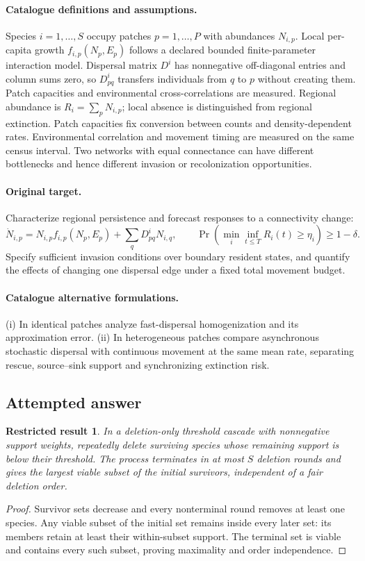 \documentclass[11pt]{article}
\newtheorem{attemptresult}{Restricted result}[section]
\begin{document}
\paragraph{Catalogue definitions and assumptions.}
Species $i=1,\ldots,S$ occupy patches $p=1,\ldots,P$ with abundances $N_{i,p}$. Local per-capita growth $f_{i,p}(N_p,E_p)$ follows a declared bounded finite-parameter interaction model. Dispersal matrix $D^i$ has nonnegative off-diagonal entries and column sums zero, so $D^i_{pq}$ transfers individuals from $q$ to $p$ without creating them. Patch capacities and environmental cross-correlations are measured. Regional abundance is $R_i=\sum_pN_{i,p}$; local absence is distinguished from regional extinction. Patch capacities fix conversion between counts and density-dependent rates. Environmental correlation and movement timing are measured on the same census interval. Two networks with equal connectance can have different bottlenecks and hence different invasion or recolonization opportunities.
\paragraph{Original target.}
Characterize regional persistence and forecast responses to a connectivity change:
\[
 \dot N_{i,p}=N_{i,p}f_{i,p}(N_p,E_p)+\sum_qD^i_{pq}N_{i,q},
 \qquad
 \Pr(\min_i\inf_{t\le T}R_i(t)\ge\eta_i)\ge1-\delta.
\]
Specify sufficient invasion conditions over boundary resident states, and quantify the effects of changing one dispersal edge under a fixed total movement budget.
\paragraph{Catalogue alternative formulations.}
(i) In identical patches analyze fast-dispersal homogenization and its approximation error. (ii) In heterogeneous patches compare asynchronous stochastic dispersal with continuous movement at the same mean rate, separating rescue, source--sink support and synchronizing extinction risk.
\subsection{Attempted answer}
\begin{attemptresult}
In a deletion-only threshold cascade with nonnegative support weights, repeatedly delete surviving species whose remaining support is below their threshold. The process terminates in at most $S$ deletion rounds and gives the largest viable subset of the initial survivors, independent of a fair deletion order.
\end{attemptresult}
\begin{proof}
Survivor sets decrease and every nonterminal round removes at least one species. Any viable subset of the initial set remains inside every later set: its members retain at least their within-subset support. The terminal set is viable and contains every such subset, proving maximality and order independence.
\end{proof}
\end{document}

